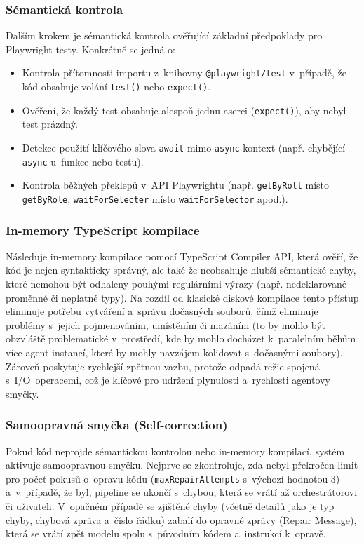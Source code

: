 \documentclass[czech, ing, kiv, he, iso690numb, viewonly]{fasthesis}
\begin{document}
\subsubsection*{Sémantická kontrola}
Dalším krokem je sémantická kontrola ověřující základní předpoklady pro Playwright testy.
Konkrétně se jedná o:

\begin{itemize}
  \item Kontrola přítomnosti importu z~knihovny \texttt{@playwright/test} v~případě, že kód obsahuje volání \texttt{test()} nebo \texttt{expect()}.
  \item Ověření, že každý test obsahuje alespoň jednu aserci (\texttt{expect()}), aby nebyl test prázdný.
  \item Detekce použití klíčového slova \texttt{await} mimo \texttt{async} kontext (např. chybějící \texttt{async} u~funkce nebo testu).
  \item Kontrola běžných překlepů v~API Playwrightu (např. \texttt{getByRoll} místo \texttt{getByRole}, \texttt{waitForSelecter} místo \texttt{waitForSelector} apod.).
\end{itemize}

\subsubsection*{In-memory TypeScript kompilace}
Následuje in-memory kompilace pomocí TypeScript Compiler API, která ověří, 
že kód je nejen syntakticky správný, ale také že neobsahuje hlubší sémantické chyby, které nemohou být odhaleny pouhými regulárními výrazy
(např. nedeklarované proměnné či neplatné typy).
Na rozdíl od klasické diskové kompilace tento přístup eliminuje potřebu vytváření a~správu dočasných souborů,
čímž eliminuje problémy s~jejich pojmenováním, umístěním či mazáním 
(to by mohlo být obzvláště problematické v~prostředí, kde by mohlo docházet k~paralelním běhům více agent instancí,
které by mohly navzájem kolidovat s~dočasnými soubory). Zároveň poskytuje rychlejší zpětnou vazbu, protože odpadá 
režie spojená s~I/O~operacemi, což je klíčové pro udržení plynulosti a~rychlosti agentovy smyčky.

\subsubsection*{Samoopravná smyčka (Self-correction)}
Pokud kód neprojde sémantickou kontrolou nebo in-memory kompilací, 
systém aktivuje samoopravnou smyčku. Nejprve se zkontroluje, 
zda nebyl překročen limit pro počet pokusů o~opravu kódu (\texttt{maxRepairAttempts} s~výchozí hodnotou 3) a~v~případě, že byl, pipeline se ukončí s~chybou, která se vrátí až orchestrátorovi či uživateli.
V~opačném případě se zjištěné chyby (včetně detailů jako je typ chyby, chybová zpráva a~číslo řádku) 
zabalí do opravné zprávy (Repair Message), která se vrátí zpět modelu spolu s~původním kódem a~instrukcí k~opravě. 
\end{document}
